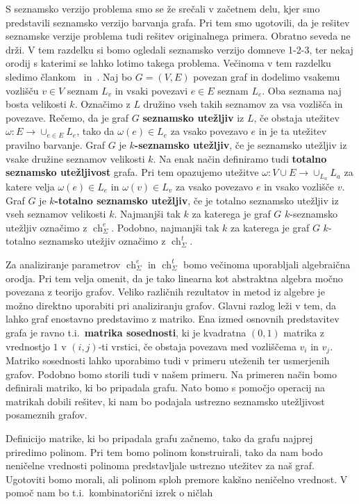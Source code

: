 \documentclass[12pt,a4paper,twoside]{article}
\theoremstyle{definition} %
\theoremstyle{plain} %
\newcommand{\ecl}{\ch_{\Sigma}^e}
\newcommand{\eclt}{\ch_{\Sigma}^t}
\numberwithin{equation}{section}  %
\DeclareMathOperator{\ch}{ch}
\begin{document}
S seznamsko verzijo problema smo se že srečali v začetnem delu, kjer smo predstavili seznamsko verzijo barvanja grafa. Pri tem smo ugotovili, da je rešitev seznamske verzije problema tudi rešitev originalnega primera. Obratno seveda ne drži. V tem razdelku si bomo ogledali seznamsko verzijo domneve 1-2-3,  ter nekaj orodij s katerimi se lahko lotimo takega problema. Večinoma v tem razdelku sledimo člankom~\cite{algebraic} in~\cite{alg_org}. Naj bo $G = (V, E)$ povezan graf in dodelimo vsakemu vozlišču $v \in V$ seznam $L_v$ in vsaki povezavi $e \in E$ seznam  $L_e$. Oba seznama naj bosta velikosti $k$. Označimo z $L$ družino vseh takih seznamov za vsa vozlišča in povezave. Rečemo, da je graf $G$ \textbf{seznamsko utežljiv} iz $L$, če obstaja utežitev $\omega : E \rightarrow \cup_{e \in E} L_e$, tako da $\omega(e) \in L_e$ za vsako povezavo $e$ in je ta utežitev pravilno barvanje. Graf $G$ je  \textbf{$k$-seznamsko utežljiv}, če je seznamsko utežljiv iz vsake družine seznamov velikosti $k$. Na enak način definiramo tudi \textbf{totalno seznamsko utežljivost} grafa. Pri tem opazujemo utežitve $\omega : V \cup E \rightarrow \cup_{L_a} L_a$ za katere velja $\omega(e) \in L_e$ in $\omega(v) \in L_v$ za vsako povezavo $e$ in vsako vozlišče $v$. Graf $G$ je \textbf{$k$-totalno seznamsko utežljiv}, če je totalno seznamsko utežljiv iz vseh seznamov velikosti $k$. Najmanjši tak $k$ za katerega je graf $G$ $k$-seznamsko utežljiv označimo z $\ecl$. Podobno, najmanjši tak $k$ za katerega je graf $G$ $k$-totalno seznamsko utežjiv označimo z $\eclt$.

Za analiziranje parametrov $\ecl$ in $\eclt$ bomo večinoma uporabljali algebraična orodja. Pri tem velja omenit, da je tako linearna kot abstraktna algebra močno povezana z teorijo grafov. Veliko različnih rezultatov in metod iz algebre je možno direktno uporabiti pri analiziranju grafov. Glavni razlog leži v tem, da lahko graf enostavno predstavimo z matriko. Ena izmed osnovnih predstavitev grafa je ravno t.i.\ \textbf{matrika sosednosti}, ki je kvadratna $(0,1)$ matrika z vrednostjo $1$ v $(i,j)$-ti vrstici, če obstaja povezava med vozliščema $v_i$ in $v_j$. Matriko sosednosti lahko uporabimo tudi v primeru uteženih ter usmerjenih grafov. Podobno bomo storili tudi v našem primeru. Na primeren način bomo definirali matriko, ki bo pripadala grafu. Nato bomo s pomočjo operacij na matrikah dobili rešitev, ki nam bo podajala ustrezno seznamsko utežljivost posameznih grafov.

Definicijo matrike, ki bo pripadala grafu začnemo, tako da grafu najprej priredimo polinom. Pri tem bomo polinom konstruirali, tako da nam bodo neničelne vrednosti polinoma predstavljale ustrezno utežitev za naš graf. Ugotoviti bomo morali, ali polinom sploh premore kakšno neničelno vrednost. V pomoč nam bo t.i.\ kombinatorični izrek o ničlah
\end{document}

